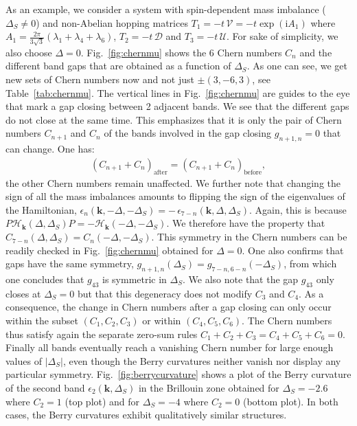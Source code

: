 \documentclass[aps,pra,showpacs,twocolumn,superscriptaddress]{revtex4-1}
\newcommand{\imag}{\mathrm{i}}
\begin{document}
As an example, we consider a system with spin-dependent mass imbalance ($\Delta_S \neq 0$) 
and non-Abelian hopping matrices $T_1=-t \,\mathcal{V}=-t \exp{(\imag A_1)}$ where 
$A_1=\frac{2\pi}{3\sqrt{3}}(\lambda_1+\lambda_4+\lambda_6)$, $T_2 = - t \, \mathcal{D}$ 
and $T_3 = -t \, \mathcal{U}$. For sake of simplicity, we also choose $\Delta =0$. 
Fig.~\ref{fig:chernmu} shows the 6 Chern numbers $C_n$ and the different band gaps 
that are obtained as a function of $\Delta_S$. As one can see, we get new sets 
of Chern numbers now and not just $\pm(3,-6,3)$, see Table~\ref{tab:chernmu}. 
The vertical lines in Fig.~\ref{fig:chernmu} are guides to the eye that mark a gap 
closing between 2 adjacent bands. We see that the different gaps do not close at the same time. 
This emphasizes that it is only the pair of Chern numbers $C_{n+1}$ and $C_n$ of the 
bands involved in the gap closing $g_{n+1,n}=0$ that can change. One has: 
\begin{align}
\left(C_{n+1}+C_n\right)_{\textrm{after}} = \left(C_{n+1}+C_n\right)_{\textrm{before}},
\end{align}
the other Chern numbers remain unaffected. We further note that changing the sign 
of all the mass imbalances amounts to flipping the sign of the eigenvalues of the 
Hamiltonian, $\epsilon_n(\mathbf{k}, -\Delta,-\Delta_S)= - \, \epsilon_{7-n}(\mathbf{k}, \Delta,\Delta_S)$. 
Again, this is because $P\mathcal{H}_\mathbf{k}(\Delta, \Delta_S)P = - \mathcal{H}_\mathbf{k}(-\Delta, -\Delta_S)$.
We therefore have the property that $C_{7-n}(\Delta, \Delta_S)=C_{n}(-\Delta,-\Delta_S)$. 
This symmetry in the Chern numbers can be readily checked in Fig.~\ref{fig:chernmu} obtained for $\Delta=0$. 
One also confirms that gaps have the same symmetry, $g_{n+1,n}(\Delta_S) = g_{7-n,6-n}(-\Delta_S)$, 
from which one concludes that $g_{43}$ is symmetric in $\Delta_S$. 
We also note that the gap $g_{43}$ only closes at $\Delta_S=0$ but that this degeneracy 
does not modify $C_3$ and $C_4$. As a consequence, the change in Chern numbers after a 
gap closing can only occur within the subset $(C_1, C_2, C_3)$ or within $(C_4,C_5,C_6)$. 
The Chern numbers thus satisfy again the separate zero-sum rules $C_1+C_2+C_3 = C_4+C_5+C_6 = 0$.
Finally all bands eventually reach a vanishing Chern number for large enough 
values of $|\Delta_S|$, even though the Berry curvatures neither vanish nor 
display any particular symmetry. Fig.~\ref{fig:berrycurvature} shows a plot 
of the Berry curvature of the second band $\epsilon_2(\mathbf{k}, \Delta_S)$ 
in the Brillouin zone obtained for $\Delta_S = -2.6$ where $C_2=1$ (top plot) 
and for $\Delta_S=-4$ where $C_2=0$ (bottom plot). In both cases, the Berry 
curvatures exhibit qualitatively similar structures. 
\end{document}
